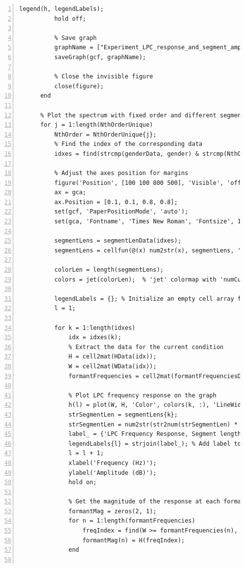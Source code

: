 \documentclass{article}
\begin{document}
\begin{lstlisting}[frame=single, numbers=left, style=Matlab-editor, caption={plotExperimentGraph.m}, label={lst:plotExperimentGraph}]
          legend(h, legendLabels);
          hold off;
  
          % Save graph
          graphName = ["Experiment_LPC_response_and_segment_amplitude_spectrum_", gender, '_segment_length_', strSegmentLen, 'ms_different_Orders'];
          saveGraph(gcf, graphName);
  
          % Close the invisible figure
          close(figure);
      end
  
      % Plot the spectrum with fixed order and different segment lengths
      for j = 1:length(NthOrderUnique)
          NthOrder = NthOrderUnique{j};
          % Find the index of the corresponding data
          idxes = find(strcmp(genderData, gender) & strcmp(NthOrderData, NthOrder));
  
          % Adjust the axes position for margins
          figure('Position', [100 100 800 500], 'Visible', 'off');
          ax = gca;
          ax.Position = [0.1, 0.1, 0.8, 0.8];
          set(gcf, 'PaperPositionMode', 'auto');
          set(gca, 'Fontname', 'Times New Roman', 'Fontsize', 10);
  
          segmentLens = segmentLenData(idxes);
          segmentLens = cellfun(@(x) num2str(x), segmentLens, 'UniformOutput',0);
  
          colorLen = length(segmentLens);
          colors = jet(colorLen);  % 'jet' colormap with 'numCurves' colors
  
          legendLabels = {}; % Initialize an empty cell array for legend labels
          l = 1;
  
          for k = 1:length(idxes)
              idx = idxes(k);
              % Extract the data for the current condition
              H = cell2mat(HData(idx));
              W = cell2mat(WData(idx));
              formantFrequencies = cell2mat(formantFrequenciesData(idx));
  
              % Plot LPC frequency response on the graph
              h(l) = plot(W, H, 'Color', colors(k, :), 'LineWidth', 1.5);
              strSegmentLen = segmentLens{k};
              strSegmentLen = num2str(str2num(strSegmentLen) * 1000);
              label_ = {'LPC Frequency Response, Segment length:', strSegmentLen, 'ms'};
              legendLabels{l} = strjoin(label_); % Add label to the legend array
              l = l + 1;
              xlabel('Frequency (Hz)');
              ylabel('Amplitude (dB)');
              hold on;
  
              % Get the magnitude of the response at each formant frequency
              formantMag = zeros(2, 1);
              for n = 1:length(formantFrequencies)
                  freqIndex = find(W >= formantFrequencies(n), 1);
                  formantMag(n) = H(freqIndex);
              end
  

\end{lstlisting}
\end{document}
